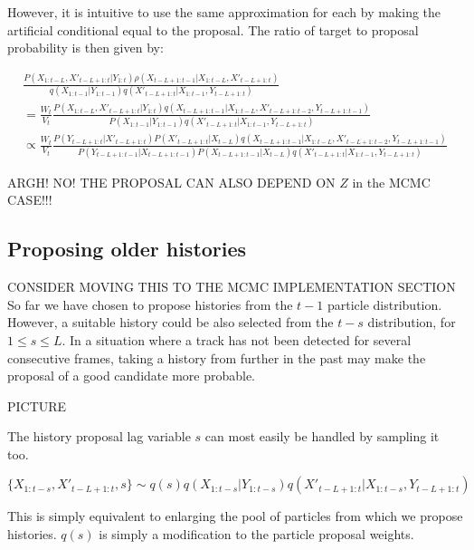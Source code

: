  However, it is intuitive to use the same approximation for each by making the artificial conditional equal to the proposal. The ratio of target to proposal probability is then given by:

\begin{multline}
\frac{ P(X_{1:t-L}, X'_{t-L+1:t}|Y_{1:t}) \rho(X_{t-L+1:t-1}|X_{1:t-L}, X'_{t-L+1:t}) }{ q(X_{1:t-1}|Y_{1:t-1}) q(X'_{t-L+1:t}|X_{1:t-1}, Y_{t-L+1:t}) } \\
= \frac{W_t}{V_t} \frac{ P(X_{1:t-L}, X'_{t-L+1:t}|Y_{1:t}) q(X_{t-L+1:t-1}|X_{1:t-L}, X'_{t-L+1:t-2}, Y_{t-L+1:t-1}) }{ P(X_{1:t-1}|Y_{1:t-1}) q(X'_{t-L+1:t}|X_{1:t-1}, Y_{t-L+1:t}) } \\
\propto \frac{W_t}{V_t} \frac{ P(Y_{t-L+1:t}|X'_{t-L+1:t}) P(X'_{t-L+1:t}|X_{t-L}) q(X_{t-L+1:t-1}|X_{1:t-L}, X'_{t-L+1:t-2}, Y_{t-L+1:t-1}) }{ P(Y_{t-L+1:t-1}|X_{t-L+1:t-1}) P(X_{t-L+1:t-1}|X_{t-L}) q(X'_{t-L+1:t}|X_{1:t-1}, Y_{t-L+1:t}) }
\label{eq:}
\end{multline}

ARGH! NO! THE PROPOSAL CAN ALSO DEPEND ON $Z$ in the MCMC CASE!!!





\subsection{Proposing older histories}
CONSIDER MOVING THIS TO THE MCMC IMPLEMENTATION SECTION
So far we have chosen to propose histories from the $t-1$ particle distribution. However, a suitable history could be also selected from the $t-s$ distribution, for $1 \le s \le L$. In a situation where a track has not been detected for several consecutive frames, taking a history from further in the past may make the proposal of a good candidate more probable.

PICTURE

The history proposal lag variable $s$ can most easily be handled by sampling it too.

\begin{equation}
\{X_{1:t-s}, X'_{t-L+1:t}, s\} \sim q(s) q(X_{1:t-s}|Y_{1:t-s}) q(X'_{t-L+1:t}|X_{1:t-s}, Y_{t-L+1:t})
\label{eq:ExtendedFLProposal}
\end{equation}

This is simply equivalent to enlarging the pool of particles from which we propose histories. $q(s)$ is simply a modification to the particle proposal weights.
